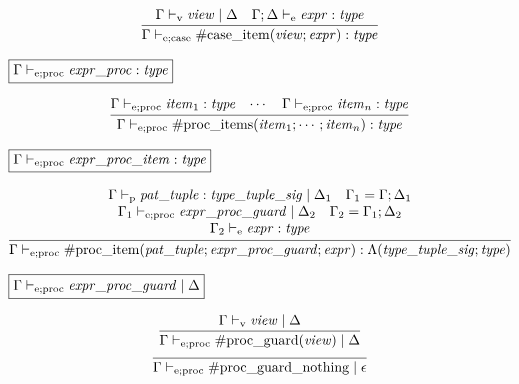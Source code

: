 \begin{gather*}
    \infer{\Gamma \vdash_{\mathrm{e}; \mathrm{case}} \mathrm{\#case\_item}(\mathit{view}; \mathit{expr}): \mathit{type}}{
        \Gamma \vdash_\mathrm{v} \mathit{view} \mid \Delta
        &
        \Gamma; \Delta \vdash_\mathrm{e} \mathit{expr}: \mathit{type}
    }
\end{gather*}

$\fbox{$\Gamma \vdash_{\mathrm{e}; \mathrm{proc}} \mathit{expr\_proc}: \mathit{type}$}$

\begin{gather*}
    \infer{\Gamma \vdash_{\mathrm{e}; \mathrm{proc}} \mathrm{\#proc\_items}(\mathit{item}_1; \cdots; \mathit{item}_n): \mathit{type}}{
        \Gamma \vdash_{\mathrm{e}; \mathrm{proc}} \mathit{item}_1: \mathit{type}
        &
        \cdots
        &
        \Gamma \vdash_{\mathrm{e}; \mathrm{proc}} \mathit{item}_n: \mathit{type}
    }
\end{gather*}

$\fbox{$\Gamma \vdash_{\mathrm{e}; \mathrm{proc}} \mathit{expr\_proc\_item}: \mathit{type}$}$

\begin{gather*}
    \infer{\Gamma \vdash_{\mathrm{e}; \mathrm{proc}} \mathrm{\#proc\_item}(\mathit{pat\_tuple}; \mathit{expr\_proc\_guard}; \mathit{expr}): \Lambda(\mathit{type\_tuple\_sig} ;\mathit{type})}{
        \begin{array}{c}
            \Gamma \vdash_\mathrm{p} \mathit{pat\_tuple}: \mathit{type\_tuple\_sig} \mid \Delta_1
            \hspace{1em}
            \Gamma_1 = \Gamma; \Delta_1
            \\
            \Gamma_1 \vdash_{\mathrm{e}; \mathrm{proc}} \mathit{expr\_proc\_guard} \mid \Delta_2
            \hspace{1em}
            \Gamma_2 = \Gamma_1; \Delta_2
            \\
            \Gamma_2 \vdash_\mathrm{e} \mathit{expr}: \mathit{type}
        \end{array}
    }
\end{gather*}

$\fbox{$\Gamma \vdash_{\mathrm{e}; \mathrm{proc}} \mathit{expr\_proc\_guard} \mid \Delta$}$

\begin{gather*}
    \infer{\Gamma \vdash_{\mathrm{e}; \mathrm{proc}} \mathrm{\#proc\_guard}(\mathit{view}) \mid \Delta}{
        \Gamma \vdash_\mathrm{v} \mathit{view} \mid \Delta
    }
    \\
    \infer{\Gamma \vdash_{\mathrm{e}; \mathrm{proc}} \mathrm{\#proc\_guard\_nothing} \mid \epsilon}{}
\end{gather*}

